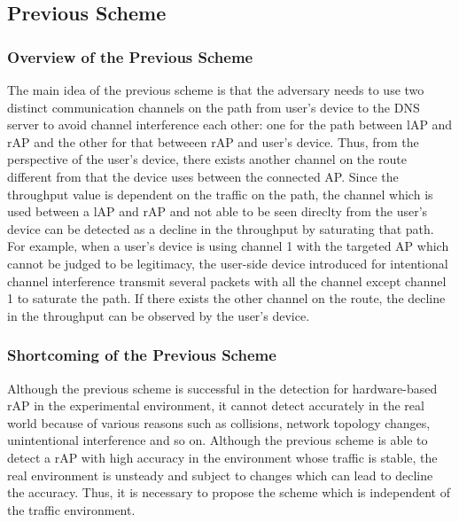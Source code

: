 \documentclass[conference]{IEEEtran}
\begin{document}
\subsection{Previous Scheme}
\subsubsection{Overview of the Previous Scheme}
The main idea of the previous scheme \cite{previous} is that the adversary needs to use two distinct communication channels on the path from user's device to the DNS server to avoid channel interference each other: one for the path between lAP and rAP and the other for that betweeen rAP and user's device.
Thus, from the perspective of the user's device, there exists another channel on the route different from that the device uses between the connected AP. 
Since the throughput value is dependent on the traffic on the path, the channel which is used between a lAP and rAP and not able to be seen direclty from the user's device can be detected as a decline in the throughput by saturating that path.
For example, when a user's device is using channel 1 with the targeted AP which cannot be judged to be legitimacy, the user-side device introduced for intentional channel interference transmit several packets with all the channel except channel 1 to saturate the path.
If there exists the other channel on the route, the decline in the throughput can be observed by the user's device.

\subsubsection{Shortcoming of the Previous Scheme}
Although the previous scheme is successful in the detection for hardware-based rAP in the experimental environment, it cannot detect accurately in the real world because of various reasons such as collisions, network topology changes, unintentional interference and so on.
Although the previous scheme is able to detect a rAP with high accuracy in the environment whose traffic is stable, the real environment is unsteady and subject to changes which can lead to decline the accuracy.
Thus, it is necessary to propose the scheme which is independent of the traffic environment. 
\end{document}
